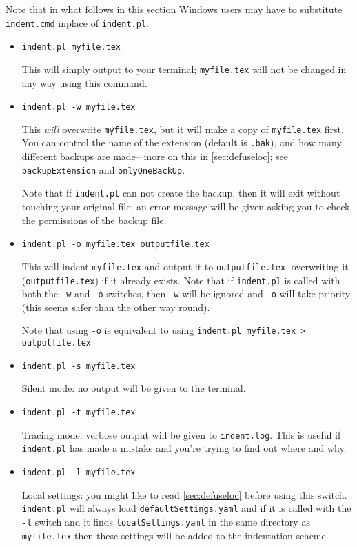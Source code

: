  	Note that in what follows in this section Windows users may have to substitute
 	\lstinline!indent.cmd! inplace of \lstinline!indent.pl!.
 	\begin{itemize}
 		\item[] \lstinline!indent.pl myfile.tex!
 		 		 		 		 					
 		This will simply output to your terminal; \lstinline!myfile.tex! will
 		not be changed in any way using this command. 
 		\item[\verbitem{-w}] \lstinline!indent.pl -w myfile.tex!
 		 		 		 		 					
 		This \emph{will} overwrite \lstinline!myfile.tex!, but it will
 		make a copy of \lstinline!myfile.tex! first. You can control the name of 
 		the extension (default is \lstinline!.bak!), and how many different backups are made-- 
 		more on this in \cref{sec:defuseloc}; see \lstinline!backupExtension! and \lstinline!onlyOneBackUp!.
 		 		 		 		 					
 		Note that if \lstinline!indent.pl! can not create the backup, then it 
 		will exit without touching your original file; an error message will be given
 		asking you to check the permissions of the backup file.
 		\item[\verbitem{-o}] \lstinline!indent.pl -o myfile.tex outputfile.tex!
 		 		 		 		 					
 		This will indent \lstinline!myfile.tex! and output it to \lstinline!outputfile.tex!, 
 		overwriting it (\lstinline!outputfile.tex!) if it already exists. Note that if \lstinline!indent.pl! is called with both
 		the \lstinline!-w! and \lstinline!-o! switches, then \lstinline!-w! will
 		be ignored and \lstinline!-o! will take priority (this seems safer than the 
 		other way round).
 		 		 		 		 					
 		Note that using \lstinline!-o! is equivalent to using \lstinline!indent.pl myfile.tex > outputfile.tex!
 		\item[\verbitem{-s}] \lstinline!indent.pl -s myfile.tex!
 		 		 		 		 					
 		Silent mode: no output will be given to the terminal.
 		\item[\verbitem{-t}] \lstinline!indent.pl -t myfile.tex!
 		 		 		 		 					
 		Tracing mode: verbose output will be given to \lstinline!indent.log!. This 
 		is useful if \lstinline!indent.pl! has made a mistake and you're
 		trying to find out where and why.
 		\item[\verbitem{-l}] \lstinline!indent.pl -l myfile.tex!
 		 		 		 		 					
 		\label{page:localswitch}
 		Local settings: you might like to read \cref{sec:defuseloc} before 
 		using this switch. \lstinline!indent.pl! will always load \lstinline!defaultSettings.yaml!
 		and if it is called with the \lstinline!-l! switch and it finds \lstinline!localSettings.yaml! 
 		in the same directory as \lstinline!myfile.tex! then these settings will be 
 		added to the indentation scheme.
 	\end{itemize}

